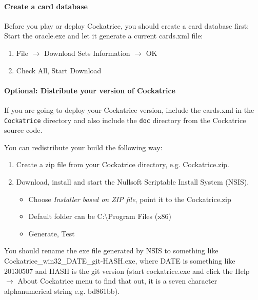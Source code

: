 \documentclass[a4paper]{scrbook}
\newcommand{\shellcmd}[1]{\texttt{\scriptsize #1}}
\begin{document}
\paragraph{Create a card database}
Before you play or deploy Cockatrice, you should create a card database first:
Start the oracle.exe and let it generate a current cards.xml file:
\begin{enumerate}
 \item File $\to$ Download Sets Information $\to$ OK
 \item Check All, Start Download
\end{enumerate}

\paragraph{Optional: Distribute your version of Cockatrice}
If you are going to deploy your Cockatrice version, include the cards.xml in the \shellcmd{Cockatrice} directory and also include the \shellcmd{doc} directory from the Cockatrice source code.

You can redistribute your build the following way:
\begin{enumerate}
 \item Create a zip file from your Cockatrice directory, e.g. Cockatrice.zip.
 \item Download, install and start the Nullsoft Scriptable Install System (NSIS).
    \begin{itemize}
     \item Choose \textit{Installer based on ZIP file}, point it to the Cockatrice.zip
     \item Default folder can be C:\textbackslash Program Files (x86)
     \item Generate, Test
    \end{itemize}
\end{enumerate}
You should rename the exe file generated by NSIS to something like Cockatrice\_win32\_DATE\_git-HASH.exe, where DATE is something like 20130507 and HASH is the git version 
(start cockatrice.exe and click the Help $\to$ About Cockatrice menu to find that out, it is a seven character alphanumerical string e.g. bd861bb).
\end{document}
